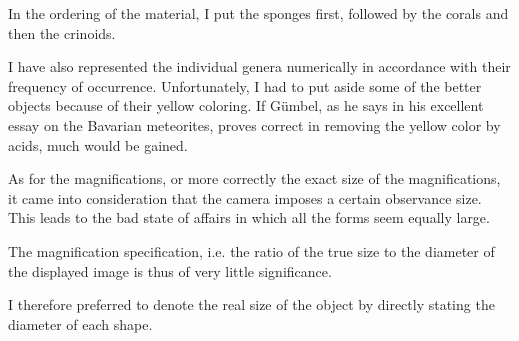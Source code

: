 \documentclass[a4paper, 12pt, oneside]{article}
\begin{document}
In the ordering of the material, I put the sponges first, followed by the corals and then the crinoids.

I have also represented the individual genera numerically in accordance with their frequency of occurrence. Unfortunately, I had to put aside some of the better objects because of their yellow coloring. If Gümbel, as he says in his excellent essay on the Bavarian meteorites, proves correct in removing the yellow color by acids, much would be gained.

As for the magnifications, or more correctly the exact size of the magnifications, it came into consideration that the camera imposes a certain observance size. This leads to the bad state of affairs in which all the forms seem equally large.

The magnification specification, i.e. the ratio of the true size to the diameter of the displayed image is thus of very little significance.

I therefore preferred to denote the real size of the object by directly stating the diameter of each shape.
\clearpage
\end{document}

